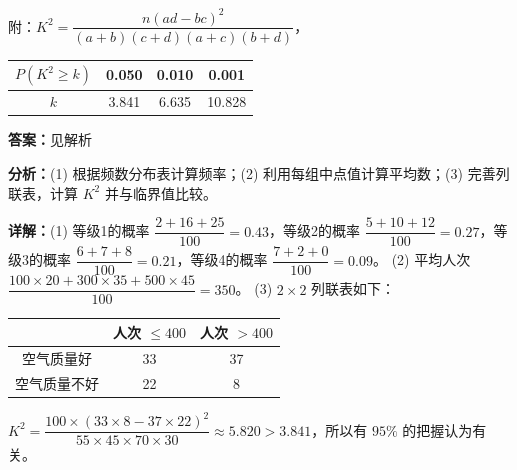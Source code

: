 \begin{question}[points=12]
\begin{center}
\end{center}

附：$K^2=\dfrac{n(ad-bc)^2}{(a+b)(c+d)(a+c)(b+d)}$，

\begin{center}

\begin{tabular}{c|ccc}

$P(K^2\ge k)$ & 0.050 & 0.010 & 0.001 \\ \hline

$k$ & 3.841 & 6.635 & 10.828 \\

\end{tabular}

\end{center}
\begin{solution}
\textbf{答案：}见解析

\textbf{分析：}(1) 根据频数分布表计算频率；(2) 利用每组中点值计算平均数；(3) 完善列联表，计算 $K^2$ 并与临界值比较。

\textbf{详解：}(1) 等级1的概率 $\dfrac{2+16+25}{100}=0.43$，等级2的概率 $\dfrac{5+10+12}{100}=0.27$，等级3的概率 $\dfrac{6+7+8}{100}=0.21$，等级4的概率 $\dfrac{7+2+0}{100}=0.09$。
(2) 平均人次 $\dfrac{100\times20+300\times35+500\times45}{100}=350$。
(3) $2\times2$ 列联表如下：
\begin{center}
\begin{tabular}{|c|c|c|}
\hline
 & 人次 $\le400$ & 人次 $>400$ \\ \hline
空气质量好 & 33 & 37 \\ \hline
空气质量不好 & 22 & 8 \\ \hline
\end{tabular}
\end{center}
$K^2=\dfrac{100\times(33\times8-37\times22)^2}{55\times45\times70\times30}\approx5.820>3.841$，所以有 $95\%$ 的把握认为有关。
\end{solution}
\end{question}

